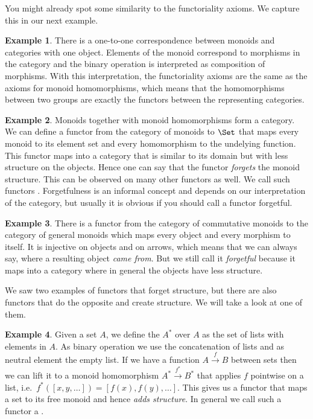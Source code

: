 \documentclass{article}
\theoremstyle{definition}
\newtheorem{example}{Example}
\begin{document}
You might already spot some similarity to the functoriality axioms.
We capture this in our next example.

\begin{example}
  There is a one-to-one correspondence between monoids and categories with one object.
  Elements of the monoid correspond to morphisms in the category and the binary operation is interpreted as composition of morphisms.
  With this interpretation, the functoriality axioms are the same as the axioms for monoid homomorphisms, which means that the homomorphisms between two groups are exactly the functors between the representing categories.
\end{example}

\begin{example}
  Monoids together with monoid homomorphisms form a category.
  We can define a functor from the category of monoids to $\Set$ that maps every monoid to its element set and every homomorphism to the undelying function.
  This functor maps into a category that is similar to its domain but with less structure on the objects.
  Hence one can say that the functor \emph{forgets} the monoid structure.
  This can be observed on many other functors as well.
  We call such functors .
  Forgetfulness is an informal concept and depends on our interpretation of the category, but usually it is obvious if you should call a functor forgetful.
\end{example}

\begin{example}
  There is a functor from the category of commutative monoids to the category of general monoids which maps every object and every morphism to itself.
  It is injective on objects and on arrows, which means that we can always say, where a resulting object \textit{came from}.
  But we still call it \emph{forgetful} because it maps into a category where in general the objects have less structure.
\end{example}

We saw two examples of functors that forget structure, but there are also functors that do the opposite and create structure.
We will take a look at one of them.

\begin{example}
  Given a set $A$, we define the  $A^*$ over $A$ as the set of lists with elements in $A$.
  As binary operation we use the concatenation of lists and as neutral element the empty list.
  If we have a function $A \xrightarrow{f} B$ between sets then we can lift it to a monoid homomorphism $A^* \xrightarrow{f^*} B^*$ that applies $f$ pointwise on a list, i.e.\ $f^*([x, y, \ldots]) = [f(x), f(y), \ldots]$.
  This gives us a functor that maps a set to its free monoid and hence \emph{adds structure}.
  In general we call such a functor a .
\end{example}
\end{document}
